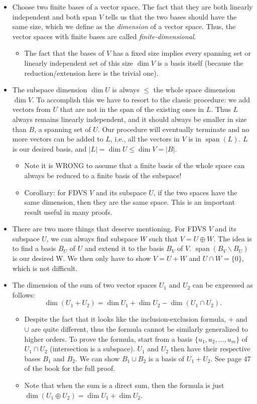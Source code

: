 \documentclass{article}
\newcommand{\s}{\operatorname{span}}
\renewcommand{\d}{\dim}
\begin{document}
\begin{itemize}
    \item Choose two finite bases of a vector space. The fact that they are both linearly independent and both span $V$ tells us that the two bases should have the same size, which we define as the \textit{dimension} of a vector space. Thus, the vector spaces with finite bases are called \textit{finite-dimensional}.
    \begin{itemize}
        \item The fact that the bases of $V$ has a fixed size implies every spanning set or linearly independent set of this size $\d V$ is a basis itself (because the reduction/extension here is the trivial one).
    \end{itemize}
    \item The subspace dimension $\d U$ is always $\leq$ the whole space dimension $\d V$. To accomplish this we have to resort to the classic procedure: we add vectors from $U$ that are not in the span of the existing ones in $L$. Thus $L$ always remains linearly independent, and it should always be smaller in size than $B$, a spanning set of $U$. Our procedure will eventually terminate and no more vectors can be added to $L$, i.e., all the vectors in $V$ is in $\s(L)$. $L$ is our desired basis, and $|L| = \d U \leq \d V = |B|$.
    \begin{itemize}
        \item Note it is WRONG to assume that a finite basis of the whole space can always be reduced to a finite basis of the subspace!
        \item Corollary: for FDVS $V$ and its subspace $U$, if the two spaces have the same dimension, then they are the same space. This is an important result useful in many proofs.
    \end{itemize}
    \item There are two more things that deserve mentioning. For FDVS $V$ and its subspace $U$, we can always find subspace $W$ such that $V = U \oplus W$. The idea is to find a basis $B_U$ of $U$ and extend it to the basis $B_V$ of $V$. $\s (B_V \backslash B_U)$ is our desired W. We then only have to show $V = U+W$ and $U \cap W = \{0\}$, which is not difficult.
    \item The dimension of the sum of two vector spaces $U_1$ and $U_2$ can be expressed as follows: $$\d (U_1 + U_2) = \d U_1 + \d U_2 - \d (U_1 \cap U_2).$$
    \begin{itemize}
        \item Despite the fact that it looks like the inclusion-exclusion formula, $+$ and $\cup$ are quite different, thus the formula cannot be similarly generalized to higher orders. To prove the formula, start from a basis $\{u_1,u_2,\dots,u_m\}$ of $U_1 \cap U_2$ (intersection is a subspace). $U_1$ and $U_2$ then have their respective bases $B_1$ and $B_2$. We can show $B_1 \cup B_2$ is a basis of $U_1 + U_2$. See page 47 of the book for the full proof.
        \item Note that when the sum is a direct sum, then the formula is just $\d(U_1 \oplus U_2) = \d U_1 + \d U_2$.
    \end{itemize}
    
\end{itemize}
\end{document}
